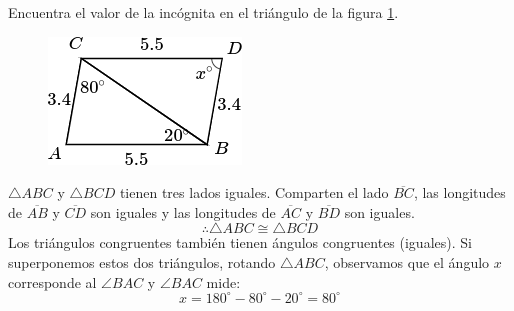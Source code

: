 Encuentra el valor de la incógnita en el triángulo de la figura \ref{fig:angle_triangle_24}.

\begin{minipage}[t][5cm][b]{0.3\textwidth}
    \begin{figure}[H]
        \centering
        \includegraphics[width=0.9\linewidth]{../images/angle_triangle_24.png}
        \caption{}
        \label{fig:angle_triangle_24}
    \end{figure}
\end{minipage}\hfill
\begin{minipage}[t]{0.65\textwidth}
    \begin{solutionbox}{5cm}
        $\triangle ABC$ y $\triangle BCD$ tienen tres lados iguales. Comparten el lado
        $\overline{BC}$, las longitudes de $\overline{AB}$ y $\overline{CD}$ son iguales y las longitudes de
        $\overline{AC}$ y $\overline{BD}$ son iguales.
        \[\therefore \triangle ABC \cong \triangle BCD\]
        Los triángulos congruentes también tienen ángulos congruentes (iguales). Si superponemos estos dos triángulos, rotando
        $\triangle ABC$, observamos que el ángulo $x$ corresponde al
        $\angle BAC$ y $\angle BAC$ mide: \[x=180^\circ-80^\circ-20^\circ=80^\circ\]
    \end{solutionbox}
\end{minipage}
